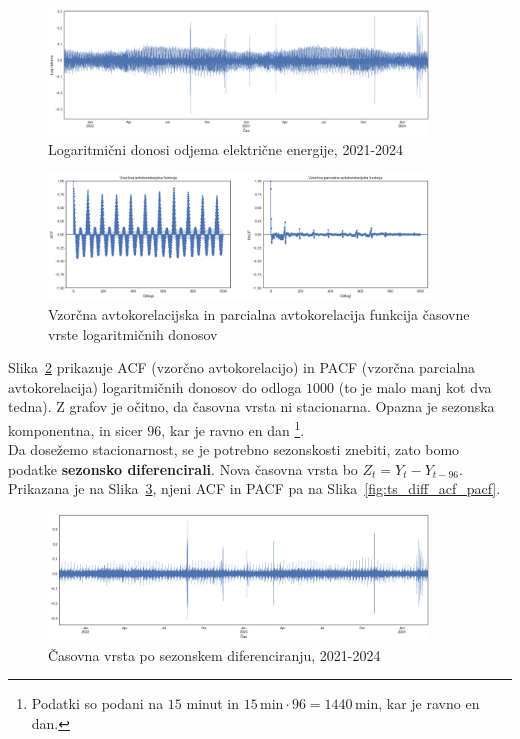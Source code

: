 \documentclass[a4paper, 11pt]{article}
\begin{document}
\begin{figure}[h!]
    \centering
    \caption{Logaritmični donosi odjema električne energije, 2021-2024}\par\medskip
    \label{fig:log_returns}
    \includegraphics[width=0.9\textwidth]{log_returns.png}
\end{figure}

\begin{figure}[h!]
    \centering
    \caption{Vzorčna avtokorelacijska in parcialna avtokorelacija funkcija časovne vrste logaritmičnih donosov}\par\medskip
    \label{fig:log_returns_acf_pacf}
    \includegraphics[width=0.9\textwidth]{log_returns_acf_pacf.png}
\end{figure}

\noindent Slika~\ref{fig:log_returns_acf_pacf} prikazuje 
ACF (vzorčno avtokorelacijo) in PACF (vzorčna parcialna avtokorelacija) logaritmičnih donosov do odloga $1000$ (to je
malo manj kot dva tedna). Z grafov je očitno, da časovna vrsta ni stacionarna. Opazna je sezonska komponentna, in sicer $96$, 
kar je ravno en dan \footnote{Podatki so podani na $15$ minut in $15\,\text{min} \cdot 96 = 1440\,\text{min}$, kar je ravno en dan.}. \\

\noindent Da dosežemo stacionarnost, se je potrebno sezonskosti znebiti, zato bomo podatke \textbf{sezonsko diferencirali}.
Nova časovna vrsta bo $Z_t = Y_t - Y_{t-96}$. Prikazana je na Slika~\ref{fig:ts_diff}, njeni ACF in PACF pa na Slika~\ref{fig:ts_diff_acf_pacf}.

\begin{figure}[h!]
    \centering
    \caption{Časovna vrsta po sezonskem diferenciranju, 2021-2024}\par\medskip
    \label{fig:ts_diff}
    \includegraphics[width=0.9\textwidth]{ts_diff.png}
\end{figure}
\end{document}
